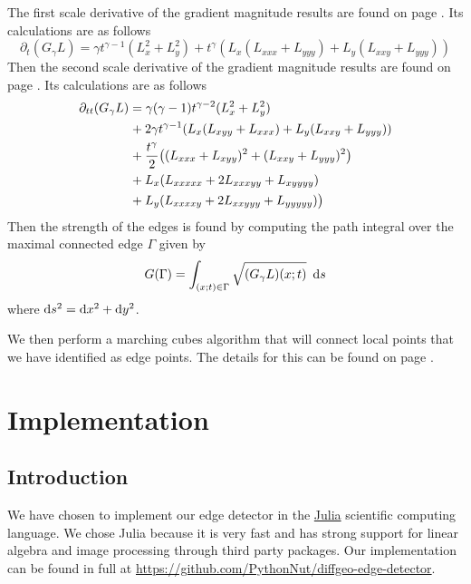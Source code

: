 \documentclass{article}
\begin{document}
The first scale derivative of the gradient magnitude results are found on page \pageref{t_tgma}. 
Its calculations are as follows \cite{Lindeberg1998}
\begin{equation} \label{dtGl}
  \partial_t (G_{\gamma}L) = \gamma t^{\gamma-1}(L_x^2+L_y^2) + t^{\gamma}(L_x(L_{xxx}+L_{yyy})+L_y(L_{xxy} + L_{yyy}))
\end{equation}
Then the second scale derivative of the gradient magnitude results are found on page \pageref{t_ttgma}.
Its calculations are as follows \cite{Lindeberg1998}
\begin{equation}
  \begin{aligned}
    \partial_{tt}(G_{\gamma}L) &= \gamma(\gamma-1)t^{\gamma-2}(L_x^2+L_y^2) \\
     & \hspace{.5pt}+ 2\gamma t^{\gamma-1}(L_x(L_{xyy}+L_{xxx})+L_y(L_{xxy}+L_{yyy})) \\
     & \hspace{.5pt}+\frac{t^{\gamma}}{2}\big((L_{xxx}+L_{xyy})^2+(L_{xxy}+L_{yyy})^2\big) \\
     & \hspace{.5pt}+ L_x(L_{xxxxx}+2L_{xxxyy}+L_{xyyyy}) \\
     & \hspace{.5pt}+ L_y(L_{xxxxy}+2L_{xxyyy}+L_{yyyyy})\big)
  \end{aligned}
\end{equation}
Then the strength of the edges is found by computing the path integral over the maximal connected edge $\Gamma$ given by \cite{Lindeberg1998}
\begin{equation}
  G(\Gamma) = \int_{(x;t) \in \Gamma} \sqrt{(G_{\gamma}L)(x;t)} \,\, \operatorname{d \!} s
\end{equation}
where $\operatorname{d \!} s^2=\operatorname{d \!} x^2+\operatorname{d \!} y^2$.

We then perform a marching cubes algorithm that will connect local points that we have identified as edge points. The details for this can be found on page \pageref{mcube}.

\section{Implementation}

\subsection{Introduction}

We have chosen to implement our edge detector in the \href{https://julialang.org/}{Julia} scientific computing language.
We chose Julia because it is very fast and has strong support for linear algebra and image processing through third party packages.
Our implementation can be found in full at \url{https://github.com/PythonNut/diffgeo-edge-detector}.
\end{document}
